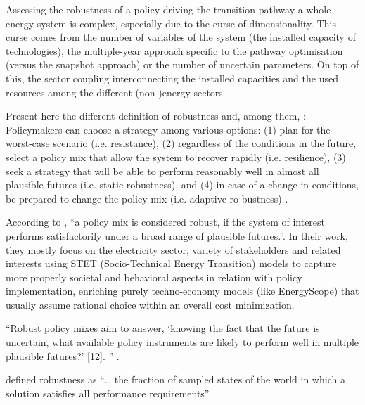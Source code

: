 
Assessing the robustness of a policy driving the transition pathway a whole-energy system is complex, especially due to the curse of dimensionality. This curse comes from the number of variables of the system (\eg the installed capacity of technologies), the multiple-year approach specific to the pathway optimisation (\ie versus the snapshot approach) or the number of uncertain parameters. On top of this, the sector coupling interconnecting the installed capacities and the used resources among the different (non-)energy sectors


Present here the different definition of robustness and, among them, : 
Policymakers can choose a
strategy among various options: (1) plan for the worst-case scenario
(i.e. resistance), (2) regardless of the conditions in the future, select a
policy mix that allow the system to recover rapidly (i.e. resilience), (3)
seek a strategy that will be able to perform reasonably well in almost all
plausible futures (i.e. static robustness), and (4) in case of a change in
conditions, be prepared to change the policy mix (i.e. adaptive ro-bustness) \cite{walker2012deep}.



According to \citet{castrejon2020making}, ``a policy mix is considered robust, if the system of interest performs satisfactorily under a broad range of plausible futures.''\cite{walker2012deep}. In their work, they mostly focus on the electricity sector, variety of stakeholders and related interests using STET (Socio-Technical Energy Transition) models to capture more properly societal and behavioral aspects in relation with policy implementation, enriching purely techno-economy models (like EnergyScope) that usually assume rational choice within an overall cost minimization.

``Robust policy mixes aim to answer, ‘knowing the fact that the future is uncertain, what available policy instruments are likely to perform well in multiple plausible futures?’ [12]. '' \cite{castrejon2020making}.


\citet{herman2014beyond} defined robustness as ``… the fraction of sampled states of the world in which a solution satisfies all performance requirements''


